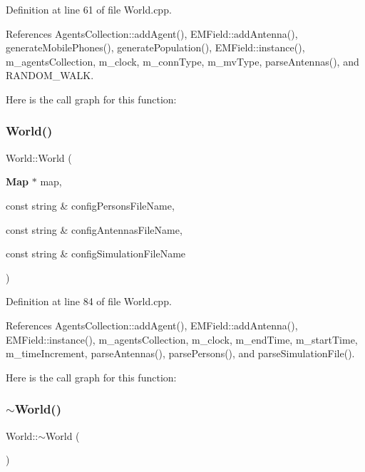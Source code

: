 Definition at line 61 of file World.\+cpp.



References Agents\+Collection\+::add\+Agent(), E\+M\+Field\+::add\+Antenna(), generate\+Mobile\+Phones(), generate\+Population(), E\+M\+Field\+::instance(), m\+\_\+agents\+Collection, m\+\_\+clock, m\+\_\+conn\+Type, m\+\_\+mv\+Type, parse\+Antennas(), and R\+A\+N\+D\+O\+M\+\_\+\+W\+A\+LK.

Here is the call graph for this function\+:
\mbox{\label{class_world_a6376bd8ac7c88b8e01e7cca06d9bb18a}} 
\subsubsection{World()\hspace{0.1cm}{\footnotesize\ttfamily [3/3]}}
{\footnotesize\ttfamily World\+::\+World (\begin{DoxyParamCaption}\item[{\textbf{ Map} $\ast$}]{map,  }\item[{const string \&}]{config\+Persons\+File\+Name,  }\item[{const string \&}]{config\+Antennas\+File\+Name,  }\item[{const string \&}]{config\+Simulation\+File\+Name }\end{DoxyParamCaption})\hspace{0.3cm}{\ttfamily [noexcept]}}



Definition at line 84 of file World.\+cpp.



References Agents\+Collection\+::add\+Agent(), E\+M\+Field\+::add\+Antenna(), E\+M\+Field\+::instance(), m\+\_\+agents\+Collection, m\+\_\+clock, m\+\_\+end\+Time, m\+\_\+start\+Time, m\+\_\+time\+Increment, parse\+Antennas(), parse\+Persons(), and parse\+Simulation\+File().

Here is the call graph for this function\+:
\mbox{\label{class_world_a8c73fba541a5817fff65147ba47cd827}} 
\subsubsection{$\sim$\+World()}
{\footnotesize\ttfamily World\+::$\sim$\+World (\begin{DoxyParamCaption}{ }\end{DoxyParamCaption})\hspace{0.3cm}{\ttfamily [virtual]}}

